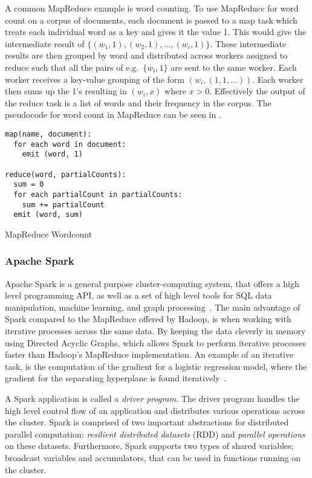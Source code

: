 A common MapReduce example is word counting. To use MapReduce for word count on a corpus of documents, each document is passed to a map task which treats each individual word as a key and gives it the value 1. This would give the intermediate result of $\{(w_1,1), (w_2,1),\dots,(w_i,1)\} $. These intermediate results are then grouped by word and distributed across workers assigned to reduce such that all the pairs of e.g.\ $\{w_i,1\}$ are sent to the same worker. Each worker receives a key-value grouping of the form $(w_i, (1,1,\dots) )$. Each worker then sums up the 1's resulting in $(w_i, x)$ where $x>0$. Effectively the output of the reduce task is a list of words and their frequency in the corpus. The pseudocode for word count in MapReduce can be seen in . 
\begin{listing}[H]
\begin{verbatim}
map(name, document):
  for each word in document:
    emit (word, 1)

reduce(word, partialCounts):
  sum = 0
  for each partialCount in partialCounts:
    sum += partialCount
  emit (word, sum)
\end{verbatim}
\caption{MapReduce Wordcount}
\label{lst:mrwordcount}
\end{listing}

\subsubsection{Apache Spark}\label{sec:spark}
Apache Spark is a general purpose cluster-computing system, that offers a high level programming API, as well as a set of high level tools for SQL data manipulation, machine learning, and graph processing~\cite{sparkintro}. The main advantage of Spark compared to the MapReduce offered by Hadoop, is when working with iterative processes across the same data. By keeping the data cleverly in memory using Directed Acyclic Graphs, which allows Spark to perform iterative processes faster than Hadoop's MapReduce implementation. An example of an iterative task, is the computation of the gradient for a logistic regression model, where the gradient for the separating hyperplane is found iteratively~\cite{ApacheSpark}.

A Spark application is called a \emph{driver program}. The driver program handles the high level control flow of an application and distributes various operations across the cluster. Spark is comprised of two important abstractions for distributed parallel computation: \emph{resilient distributed datasets} (RDD) and \emph{parallel operations} on these datasets. Furthermore, Spark supports two types of shared variables; broadcast variables and accumulators, that can be used in functions running on the cluster.

